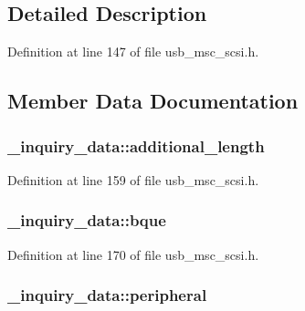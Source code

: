 \subsection{Detailed Description}


Definition at line 147 of file usb\+\_\+msc\+\_\+scsi.\+h.



\subsection{Member Data Documentation}
\subsubsection[{\texorpdfstring{additional\+\_\+length}{additional_length}}]{ \+\_\+inquiry\+\_\+data\+::additional\+\_\+length}\hypertarget{struct__inquiry__data_a951da49625da170d416c16d583ea8614}{}\label{struct__inquiry__data_a951da49625da170d416c16d583ea8614}


Definition at line 159 of file usb\+\_\+msc\+\_\+scsi.\+h.

\subsubsection[{\texorpdfstring{bque}{bque}}]{ \+\_\+inquiry\+\_\+data\+::bque}\hypertarget{struct__inquiry__data_a9e90e27b6b8f5f3b6d34f0884c28dcb6}{}\label{struct__inquiry__data_a9e90e27b6b8f5f3b6d34f0884c28dcb6}


Definition at line 170 of file usb\+\_\+msc\+\_\+scsi.\+h.

\subsubsection[{\texorpdfstring{peripheral}{peripheral}}]{ \+\_\+inquiry\+\_\+data\+::peripheral}\hypertarget{struct__inquiry__data_a78ab6604b3ece07b19f46436fb34eb24}{}\label{struct__inquiry__data_a78ab6604b3ece07b19f46436fb34eb24}


